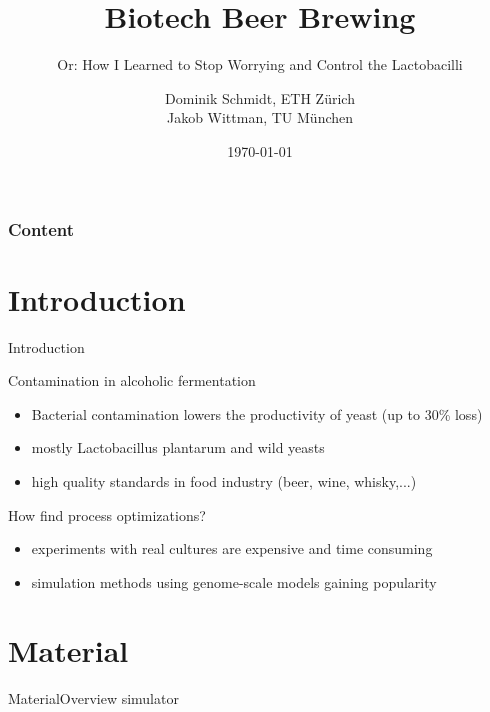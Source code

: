 \documentclass{beamer}
\title{Biotech Beer Brewing}
\subtitle{Or: How I Learned to Stop Worrying and Control the Lactobacilli}
\author{Dominik Schmidt, ETH Zürich\\Jakob Wittman, TU München}
\institute{Háskóli Íslands}
\date{\today}
\begin{document}
\begin{frame}[plain]
	\titlepage
\end{frame}
\begin{frame}
  \frametitle{Content}
  \tableofcontents
\end{frame}

\section{Introduction}
\begin{frame}{Introduction}
  \begin{block}{Contamination in alcoholic fermentation}
    \begin{itemize}
      \item Bacterial contamination lowers the productivity of yeast (up to 30\% loss)
      \item mostly Lactobacillus plantarum and wild yeasts
      \item high quality standards in food industry (beer, wine, whisky,...)
    \end{itemize}
  \end{block}

  \begin{block}{How find process optimizations?}
    \begin{itemize}
     \item experiments with real cultures are expensive and time consuming
     \item simulation methods using genome-scale models gaining popularity
    \end{itemize}
  \end{block}
\end{frame}

\section{Material}
\begin{frame}{Material}{Overview simulator}
  
\end{frame}
\end{document}
